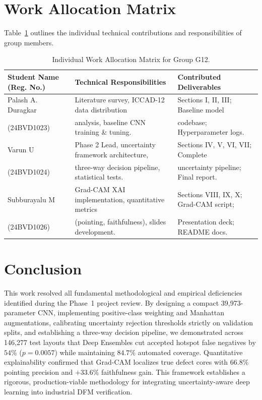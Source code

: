 \documentclass[11pt,journal,onecolumn]{IEEEtran}
\begin{document}
\section{Work Allocation Matrix}
Table~\ref{tab:allocation} outlines the individual technical contributions and responsibilities of group members.

\begin{table}[htbp]
\caption{Individual Work Allocation Matrix for Group G12.}
\label{tab:allocation}
\centering
\begin{tabular}{lll}
\toprule
\textbf{Student Name (Reg. No.)} & \textbf{Technical Responsibilities} & \textbf{Contributed Deliverables} \\
\midrule
Palash A. Duragkar & Literature survey, ICCAD-12 data distribution & Sections I, II, III; Baseline model \\
(24BVD1023) & analysis, baseline CNN training \& tuning. & codebase; Hyperparameter logs. \\
\midrule
Varun U & Phase 2 Lead, uncertainty framework architecture, & Sections IV, V, VI, VII; Complete \\
(24BVD1024) & three-way decision pipeline, statistical tests. & uncertainty pipeline; Final report. \\
\midrule
Subburayalu M & Grad-CAM XAI implementation, quantitative metrics & Sections VIII, IX, X; Grad-CAM script; \\
(24BVD1026) & (pointing, faithfulness), slides development. & Presentation deck; README docs. \\
\bottomrule
\end{tabular}
\end{table}

\section{Conclusion}
This work resolved all fundamental methodological and empirical deficiencies identified during the Phase~1 project review. By designing a compact 39,973-parameter CNN, implementing positive-class weighting and Manhattan augmentations, calibrating uncertainty rejection thresholds strictly on validation splits, and establishing a three-way decision pipeline, we demonstrated across 146,277 test layouts that Deep Ensembles cut accepted hotspot false negatives by $54\%$ ($p = 0.0057$) while maintaining $84.7\%$ automated coverage. Quantitative explainability confirmed that Grad-CAM localizes true defect cores with $66.8\%$ pointing precision and $+33.6\%$ faithfulness gain. This framework establishes a rigorous, production-viable methodology for integrating uncertainty-aware deep learning into industrial DFM verification.
\end{document}
